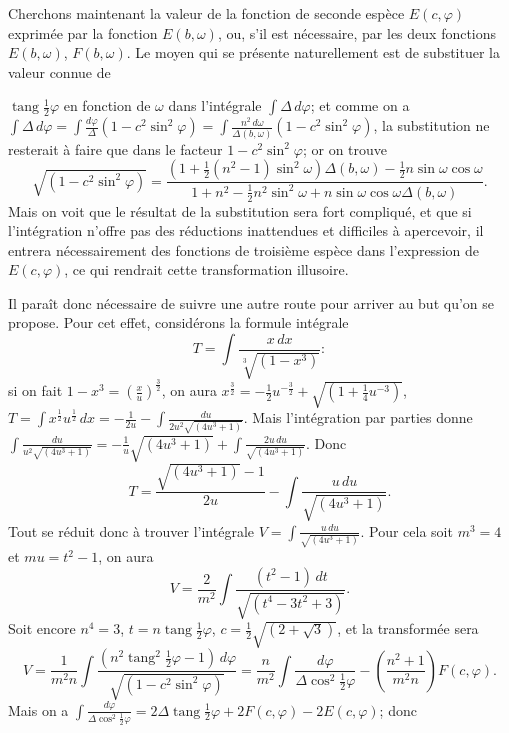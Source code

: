 \documentclass{article}
\begin{document}
Cherchons maintenant la valeur de la fonction de seconde espèce $E(c,\varphi)$ exprimée par la fonction $E(b,\omega)$, ou, s'il est nécessaire, par les deux fonctions $E(b,\omega)$, $F(b,\omega)$. Le moyen qui se présente naturellement est de substituer la valeur connue de

$\operatorname{tang}\frac{1}{2}\varphi$ en fonction de $\omega$ dans l'intégrale $\displaystyle\int\Delta\,d\varphi$; et comme on a $\displaystyle\int\Delta\,d\varphi=\displaystyle\int\frac{d\varphi}{\Delta}(1-c^{2}\sin^{2}\varphi)=\displaystyle\int\frac{n^{2}\,d\omega}{\Delta(b,\omega)}(1-c^{2}\sin^{2}\varphi)$, la substitution ne resterait à faire que dans le facteur $1-c^{2}\sin^{2}\varphi$; or on trouve
\[ \sqrt{(1-c^{2}\sin^{2}\varphi)}=\frac{(1+\tfrac{1}{2}(n^{2}-1)\sin^{2}\omega)\Delta(b,\omega)-\tfrac{1}{2}n\sin\omega\cos\omega}{1+n^{2}-\tfrac{1}{2}n^{2}\sin^{2}\omega+n\sin\omega\cos\omega\Delta(b,\omega)}. \]
Mais on voit que le résultat de la substitution sera fort compliqué, et que si l'intégration n'offre pas des réductions inattendues et difficiles à apercevoir, il entrera nécessairement des fonctions de troisième espèce dans l'expression de $E(c,\varphi)$, ce qui rendrait cette transformation illusoire.

Il paraît donc nécessaire de suivre une autre route pour arriver au but qu'on se propose. Pour cet effet, considérons la formule intégrale
\[ T=\int\frac{x\,dx}{\sqrt[3]{(1-x^{3})}}: \]
si on fait $1-x^{3}=\left(\frac{x}{u}\right)^{\frac{3}{2}}$, on aura $x^{\frac{3}{2}}=-\frac{1}{2}u^{-\frac{3}{2}}+\sqrt{(1+\frac{1}{4}u^{-3})}$, $T=\displaystyle\int x^{\frac{1}{2}}u^{\frac{1}{2}}\,dx=-\frac{1}{2u}-\displaystyle\int\frac{du}{2u^{2}\sqrt{(4u^{3}+1)}}$. Mais l'intégration par parties donne $\displaystyle\int\frac{du}{u^{2}\sqrt{(4u^{3}+1)}}=-\frac{1}{u}\sqrt{(4u^{3}+1)}+\displaystyle\int\frac{2u\,du}{\sqrt{(4u^{3}+1)}}$. Donc
\[ T=\frac{\sqrt{(4u^{3}+1)}-1}{2u}-\int\frac{u\,du}{\sqrt{(4u^{3}+1)}}. \]
Tout se réduit donc à trouver l'intégrale $V=\displaystyle\int\frac{u\,du}{\sqrt{(4u^{3}+1)}}$. Pour cela soit $m^{3}=4$ et $mu=t^{2}-1$, on aura
\[ V=\frac{2}{m^{2}}\int\frac{(t^{2}-1)\,dt}{\sqrt{(t^{4}-3t^{2}+3)}}. \]
Soit encore $n^{4}=3$, $t=n\operatorname{tang}\frac{1}{2}\varphi$, $c=\frac{1}{2}\sqrt{(2+\sqrt{3})}$, et la transformée sera
\[ V=\frac{1}{m^{2}n}\int\frac{(n^{2}\operatorname{tang}^{2}\tfrac{1}{2}\varphi-1)\,d\varphi}{\sqrt{(1-c^{2}\sin^{2}\varphi)}}=\frac{n}{m^{2}}\int\frac{d\varphi}{\Delta\cos^{2}\tfrac{1}{2}\varphi}-\left(\frac{n^{2}+1}{m^{2}n}\right)F(c,\varphi). \]
Mais on a $\displaystyle\int\frac{d\varphi}{\Delta\cos^{2}\frac{1}{2}\varphi}=2\Delta\operatorname{tang}\frac{1}{2}\varphi+2F(c,\varphi)-2E(c,\varphi)$; donc
\end{document}
